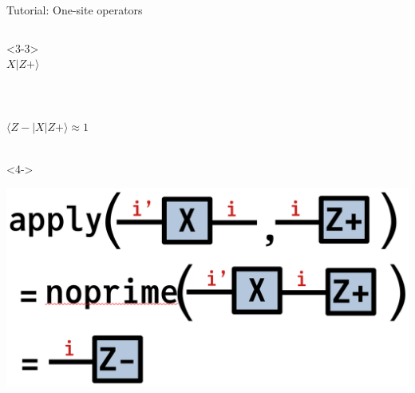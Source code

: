 \begin{frame}[fragile]{Tutorial: One-site operators}
\begin{columns}
\begin{column}{4.5cm}
\begin{onlyenv}<3-3>
\vspace*{0.0cm}
~\\
$X|Z+\rangle$ \\
~\\
~\\
~\\
$\langle Z-|X|Z+\rangle \approx 1$ \\
~\\
\end{onlyenv}

\begin{onlyenv}<4->
\vspace*{0.2cm}
~\\
\begin{center}
\includegraphics[width=1.0\textwidth]{
  slides/assets/apply_XZp.png
}
\end{center}
\vspace*{0.0cm}
\end{onlyenv}

\end{column}

\end{columns}

\end{frame}
